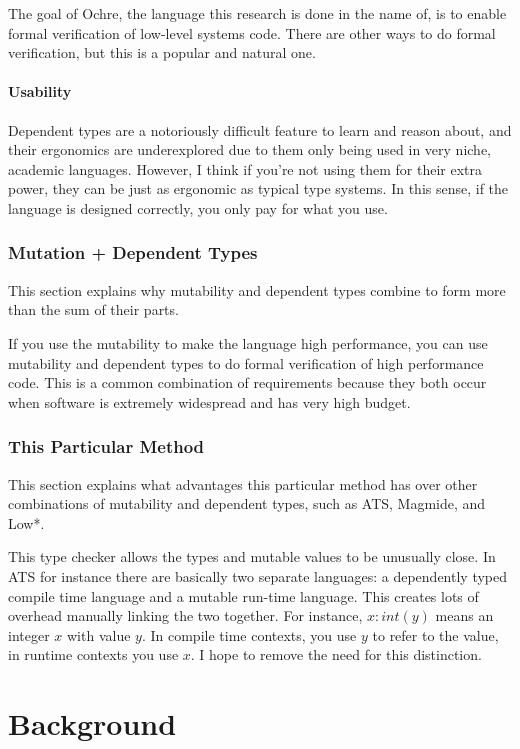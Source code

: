 \documentclass[12pt,twoside]{report}
\begin{document}
The goal of Ochre, the language this research is done in the name of, is to enable formal verification of low-level systems code. There are other ways to do formal verification, but this is a popular and natural one.

\subsubsection{Usability}
Dependent types are a notoriously difficult feature to learn and reason about, and their ergonomics are underexplored due to them only being used in very niche, academic languages. However, I think if you're not using them for their extra power, they can be just as ergonomic as typical type systems. In this sense, if the language is designed correctly, you only pay for what you use.

\subsection{Mutation + Dependent Types}
This section explains why mutability and dependent types combine to form more than the sum of their parts.

If you use the mutability to make the language high performance, you can use mutability and dependent types to do formal verification of high performance code. This is a common combination of requirements because they both occur when software is extremely widespread and has very high budget.

\subsection{This Particular Method}
This section explains what advantages this particular method has over other combinations of mutability and dependent types, such as ATS, Magmide, and Low*.

This type checker allows the types and mutable values to be unusually close. In ATS for instance there are basically two separate languages: a dependently typed compile time language and a mutable run-time language. This creates lots of overhead manually linking the two together. For instance, $x : int(y)$ means an integer $x$ with value $y$. In compile time contexts, you use $y$ to refer to the value, in runtime contexts you use $x$. I hope to remove the need for this distinction.

\chapter{Background}
\label{background}
\end{document}
